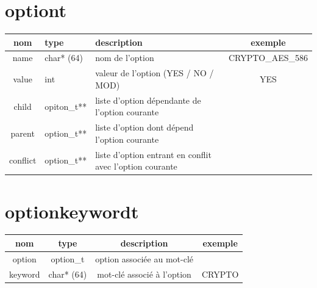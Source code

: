 \documentclass[16pts]{report}
\begin{document}
\section{option\textunderscore t}
\label{sec:option t}

\begin{tabularx}{\textwidth}{|c|X|X|c|}
\hline
nom & type & description & exemple \\
\hline
\hline
name & char* (64) & nom de l'option & CRYPTO\_AES\_586 \\
\hline
value & int & valeur de l'option (YES / NO / MOD) & YES \\
\hline
child & opiton\_t** & liste d'option dépendante de l'option courante & \\
\hline
parent & option\_t** & liste d'option dont dépend l'option courante & \\
\hline
conflict & option\_t** & liste d'option entrant en conflit avec l'option courante &   \\
\hline
\end{tabularx}

\section{option\textunderscore keyword\textunderscore t}
\label{sec:option keyword t}

\begin{tabular}{|c|c|c|c|}
\hline
nom & type & description & exemple \\
\hline
\hline
option & option\_t & option associée au mot-clé & \\
\hline
keyword & char* (64) & mot-clé associé à l'option & CRYPTO \\
\hline
\end{tabular}
\end{document}
